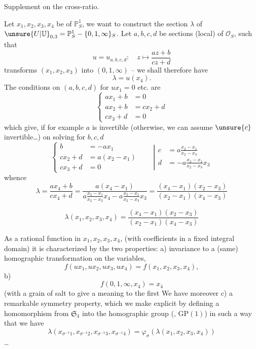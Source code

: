 Supplement on the cross-ratio.

Let $x_1,x_2,x_3,x_4$ be  of
$\mathbb P^1_S$, we want to construct the  section $\lambda$
of $\unsure{U|\mathbb U}_{0,3}=\mathbb P^1_S-\{0,1,\infty\}_S$.
Let $a,b,c,d$ be sections
(local) of $\mathcal O_S$,  such that
\[
u=u_{a,b,c,d}:\quad z\longmapsto\frac{az+b}{cz+d}
\tag{77}
\]
transforms $(x_1,x_2,x_3)$ into $(0,1,\infty)$ -- we
shall therefore have
\[
\lambda=u(x_4).
\tag{78}
\]
The conditions on  $(a,b,c,d)$ for $ux_1=0$ etc. are
\[
\left\{\begin{aligned}
ax_1+b&=0\\
ax_2+b&=cx_2+d\\
cx_3+d&=0
\end{aligned}\right.
\]
which give, if for example $a$ is invertible (otherwise, we
can assume $\unsure{c}$ invertible\ldots) on solving for $b,c,d$
\[
\left\{\begin{aligned}
b&=-ax_1\\
cx_2+d&=a(x_2-x_1)\\
cx_3+d&=0
\end{aligned}\right.
\qquad\left|\begin{aligned}
c&=a\frac{x_2-x_1}{x_2-x_3}\\
d&=-a\frac{x_2-x_1}{x_2-x_3}x_3
\end{aligned}\right.
\]
whence
\[
\lambda=\frac{ax_4+b}{cx_4+d}
=\frac{a(x_4-x_1)}{a\frac{x_2-x_1}{x_2-x_3}x_4-a\frac{x_2-x_1}{x_2-x_3}x_3}
=\frac{(x_4-x_1)(x_2-x_3)}{(x_2-x_1)(x_4-x_3)}
\]


\[
\lambda(x_1,x_2,x_3,x_4)=\frac{(x_4-x_1)(x_2-x_3)}{(x_2-x_1)(x_4-x_3)}
\tag{79}
\]

As a rational function in $x_1,x_2,x_3,x_4$,
(with coefficients in a fixed integral domain) it
is characterized by the two properties: a) invariance  to a (same)
homographic transformation on the variables,  
\[
f(ux_1,ux_2,ux_3,ux_4)=f(x_1,x_2,x_3,x_4),
\]
 b)
\[
f(0,1,\infty,x_4)=x_4
\]
(with a grain of salt to give a
meaning to the first  We have moreover
c) a remarkable symmetry property,
which we  make explicit by defining a homomorphism
from $\mathfrak S_4$ into the homographic group
(, $\mathrm{GP}(1)$)
in such a way that we have
\[
\lambda(x_{\sigma^{-1}1},x_{\sigma^{-1}2},x_{\sigma^{-1}3},x_{\sigma^{-1}4})
=\varphi_\sigma(\lambda(x_1,x_2,x_3,x_4))
\tag{80}
\]
\ldots